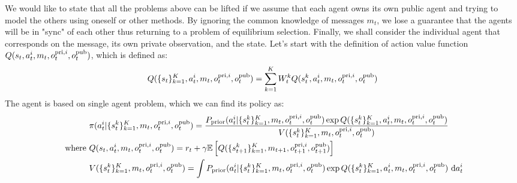 We would like to state that all the problems above can be lifted if we assume that each agent owns its own public agent and trying to model the others using oneself or other methods. By ignoring the common knowledge of messages $m_t$, we lose a guarantee that the agents will be in "sync" of each other thus returning to a problem of equilibrium selection. Finally, we shall consider the individual agent that corresponds on the message, its own private observation, and the state. Let's start with the definition of action value function $Q(s_t, a^i_t, m_t, o^{\operatorname{pri}, i}_t, o^{\operatorname{pub}}_t)$, which is defined as:
\begin{equation}
    Q(\{s_t\}^K_{k=1}, a^i_t, m_t, o^{\operatorname{pri}, i}_t, o^{\operatorname{pub}}_t) = \sum^K_{k=1} W^k_t Q(s_t^k, a^i_t, m_t, o^{\operatorname{pri}, i}_t, o^{\operatorname{pub}}_t)
\end{equation}
The agent is based on single agent problem, which we can find its policy as:
\begin{equation}
\begin{aligned}
    &\pi(a^i_t | \{s_t^k\}^K_{k=1}, m_t, o^{\operatorname{pri}, i}_t, o^{\operatorname{pub}}_t) = \frac{P_{\text{prior}}(a^i_t | \{s_t^k\}^K_{k=1}, m_t, o^{\operatorname{pri}, i}_t, o^{\operatorname{pub}}_t)\exp{Q(\{s_t^k\}^K_{k=1}, a^i_t, m_t, o^{\operatorname{pri}, i}_t, o^{\operatorname{pub}}_t)}}{V(\{s_t^k\}^K_{k=1}, m_t, o^{\operatorname{pri}, i}_t, o^{\operatorname{pub}}_t)} \\
    \text{ where }&Q(s_t, a^i_t, m_t, o^{\operatorname{pri}, i}_t, o^{\operatorname{pub}}_t) = r_t + \gamma\mathbb{E}\left[ Q(\{s_{t+1}^k\}^K_{k=1}, m_{t+1}, o^{\operatorname{pri}, i}_{t+1}, o^{\operatorname{pub}}_{t+1}) \right] \\
    &V(\{s_t^k\}^K_{k=1}, m_t, o^{\operatorname{pri}, i}_t, o^{\operatorname{pub}}_t) = \int P_{\text{prior}}(a^i_t | \{s_t^k\}^K_{k=1}, m_t, o^{\operatorname{pri}, i}_t, o^{\operatorname{pub}}_t)\exp{Q(\{s_t^k\}^K_{k=1}, a^i_t, m_t, o^{\operatorname{pri}, i}_t, o^{\operatorname{pub}}_t)} \ \mathrm{d} a^i_t
\end{aligned}
\end{equation}
